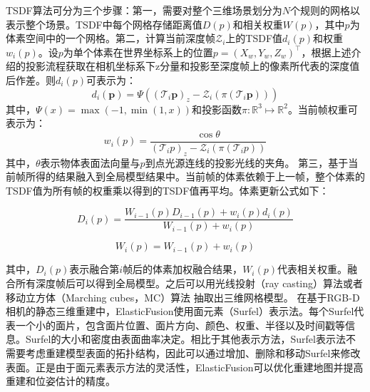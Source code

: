 TSDF算法可分为三个步骤：第一，需要对整个三维场景划分为$N$个规则的网格以表示整个场景。TSDF中每个网格存储距离值$D(p)$和相关权重$W(p)$，其中$p$为体素空间中的一个网格。第二，计算当前深度帧$\mathcal{Z}_{i}$上的TSDF值$d_i(p)$和权重$w_i(p)$。设$p$为单个体素在世界坐标系上的位置$p = (X_w,Y_w,Z_w)^\top$，根据上述介绍的投影流程获取在相机坐标系下z分量和投影至深度帧上的像素所代表的深度值后作差。则$d_i(p)$可表示为：
\begin{equation}
d_{i}(\boldsymbol{p})=\Psi\left(\left(\mathcal{T}_{i} \boldsymbol{p}\right)_{z}-\mathcal{Z}_{i}\left(\pi\left(\mathcal{T}_{i} \boldsymbol{p}\right)\right)\right) 
\end{equation}
其中，$\Psi(x) =\max \left(-1, \min \left(1, x\right)\right)$和投影函数$ \pi: \mathbb{R}^{3} \mapsto \mathbb{R}^{2}$。当前帧权重可表示为：
\begin{equation}
w_i(p) = \frac{ \cos \theta} { \left(\mathcal{T}_{i} p\right)_{z}-\mathcal{Z}_{i}\left(\pi\left(\mathcal{T}_{i}p\right)\right)} 
\end{equation}其中，$\theta$表示物体表面法向量与$p$到点光源连线的投影光线的夹角。
第三，基于当前帧所得的结果融入到全局模型结果中。当前帧的体素依赖于上一帧，整个体素的TSDF值为所有帧的权重乘以得到的TSDF值再平均。体素更新公式如下：


\begin{equation}
D_{i}(p)=\frac{W_{i-1}(p) D_{i-1}(p)+w_{i}(p) d_{i}(p)}{W_{i-1}(p)+w_{i}(p)}
\end{equation}
\vspace{-10ex}

\begin{equation}
W_{i}(p)=W_{i-1}(p)+w_{i}(p)
\end{equation}

\noindent 其中，$D_i(p)$表示融合第$i$帧后的体素加权融合结果，$W_i(p)$代表相关权重。融合所有深度帧后可以得到全局模型。之后可以用光线投射（ray casting）算法或者移动立方体（Marching cubes，MC）算法 抽取出三维网格模型。
在基于RGB-D相机的静态三维重建中，ElasticFusion使用面元素（Surfel）表示法。每个Surfel代表一个小的面片，包含面片位置、面片方向、颜色、权重、半径以及时间戳等信息。Surfel的大小和密度由表面曲率决定。相比于其他表示方法，Surfel表示法不需要考虑重建模型表面的拓扑结构，因此可以通过增加、删除和移动Surfel来修改表面。正是由于面元素表示方法的灵活性，ElasticFusion可以优化重建地图并提高重建和位姿估计的精度。\par

